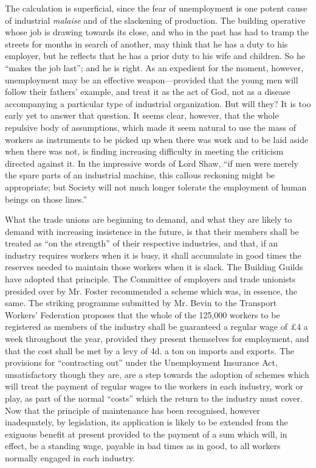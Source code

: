 \documentclass{book}
\begin{document}
The calculation is superficial, since the fear of unemployment is one potent cause of industrial \emph{malaise} and of the slackening of production. The building operative whose job is drawing towards its close, and who in the past has had to tramp the streets for months in search of another, may think that he has a duty to his employer, but he reflects that he has a prior duty to his wife and children. So he “makes the job last”; and he is right. As an expedient for the moment, however, unemployment may be an effective weapon—provided that the young men will follow their fathers’ example, and treat it as the act of God, not as a disease accompanying a particular type of industrial organization. But will they? It is too early yet to answer that question. It seems clear, however, that the whole repulsive body of assumptions, which made it seem natural to use the mass of workers as instruments to be picked up when there was work and to be laid aside when there was not, is finding increasing difficulty in meeting the criticism directed against it. In the impressive words of Lord Shaw, “if men were merely the spare parts of an industrial machine, this callous reckoning might be appropriate; but Society will not much longer tolerate the employment of human beings on those lines.”\footnotemark[1]

What the trade unions are beginning to demand, and what they are likely to demand with increasing insistence in the future, is that their members shall be treated as “on the strength” of their respective industries, and that, if an industry requires workers when it is busy, it shall accumulate in good times the reserves needed to maintain those workers when it is slack. The Building Guilds have adopted that principle. The Committee of employers and trade unionists presided over by Mr. Foster recommended a scheme which was, in essence, the same. The striking programme submitted by Mr. Bevin to the Transport Workers’ Federation proposes that the whole of the 125,000 workers to be registered as members of the industry shall be guaranteed a regular wage of £4 a week throughout the year, provided they present themselves for employment, and that the cost shall be met by a levy of 4d. a ton on imports and exports. The provisions for “contracting out” under the Unemployment Insurance Act, unsatisfactory though they are, are a step towards the adoption of schemes which will treat the payment of regular wages to the workers in each industry, work or play, as part of the normal “costs” which the return to the industry must cover. Now that the principle of maintenance has been recognised, however inadequately, by legislation, its application is likely to be extended from the exiguous benefit at present provided to the payment of a sum which will, in effect, be a standing wage, payable in bad times as in good, to all workers normally engaged in each industry.
\end{document}

